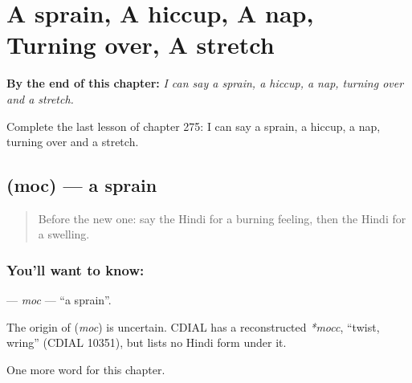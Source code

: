 
\chapter{A sprain, A hiccup, A nap, Turning over, A stretch}
\label{ch:hi-a-sprain-a-hiccup-a-nap-turning-over-a-stretch}

\begin{chapteropening}
\textbf{By the end of this chapter:} \emph{I can say a sprain, a hiccup, a nap, turning over and a stretch.}

Complete the last lesson of chapter 275: I can say a sprain, a hiccup, a nap, turning over and a stretch.
\end{chapteropening}

\section[\texorpdfstring{\hi{मोच} (moc)}{मोच (moc)}]{ (moc) — a sprain}

\label{lesson:HI-C275-moc}



\begin{quote}
Before the new one: say the Hindi for a burning feeling, then the Hindi for a swelling.
\end{quote}

\subsection*{You'll want to know: }
\textbf{} — \emph{moc} — \textquotedblleft{}a sprain\textquotedblright{}.

\begin{cousinweb}
The origin of \textbf{} (\emph{moc}) is uncertain. CDIAL has a reconstructed \emph{*mocc}, \textquotedblleft{}twist, wring\textquotedblright{} (CDIAL 10351), but lists no Hindi form under it.
\end{cousinweb}

\begin{grammarlens}[title={What you've built}]
One more word for this chapter.
\end{grammarlens}

